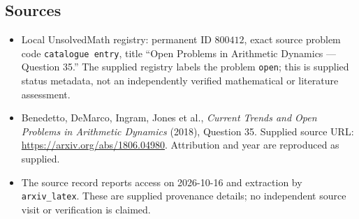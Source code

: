 \documentclass[11pt]{article}
\begin{document}
\subsection{Sources}
\begin{itemize}
\item Local UnsolvedMath registry: permanent ID \(800412\), exact source problem code \texttt{catalogue entry}, title ``Open Problems in Arithmetic Dynamics --- Question 35.'' The supplied registry labels the problem \texttt{open}; this is supplied status metadata, not an independently verified mathematical or literature assessment.
\item Benedetto, DeMarco, Ingram, Jones et al., \emph{Current Trends and Open Problems in Arithmetic Dynamics} (2018), Question 35. Supplied source URL: \url{https://arxiv.org/abs/1806.04980}. Attribution and year are reproduced as supplied.
\item The source record reports access on 2026-10-16 and extraction by \texttt{arxiv\_latex}. These are supplied provenance details; no independent source visit or verification is claimed.
\end{itemize}
\end{document}
